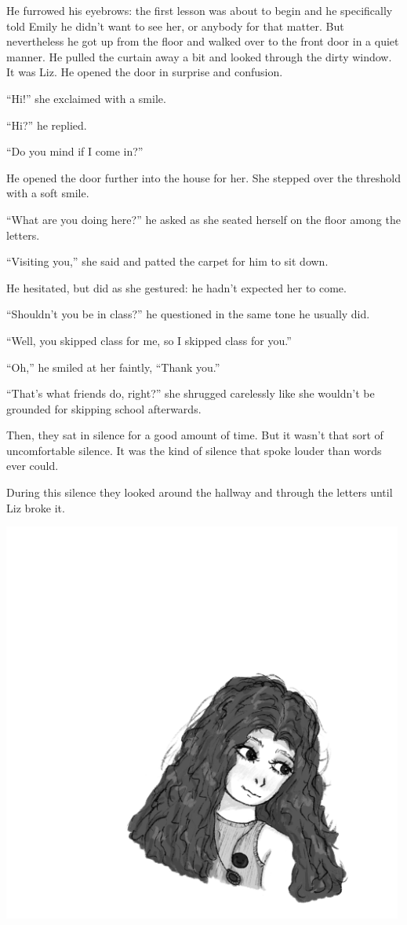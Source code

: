 He furrowed his eyebrows: the first lesson was about to begin and he specifically told Emily he didn't want to see her, or anybody for that matter. But nevertheless he got up from the floor and walked over to the front door in a quiet manner. He pulled the curtain away a bit and looked through the dirty window. It was Liz. He opened the door in surprise and confusion.

“Hi!” she exclaimed with a smile.

“Hi?” he replied.

“Do you mind if I come in?”

He opened the door further into the house for her. She stepped over the threshold with a soft smile.

“What are you doing here?” he asked as she seated herself on the floor among the letters.

“Visiting you,” she said and patted the carpet for him to sit down.

He hesitated, but did as she gestured: he hadn't expected her to come.

“Shouldn't you be in class?” he questioned in the same tone he usually did.

“Well, you skipped class for me, so I skipped class for you.”

“Oh,” he smiled at her faintly, “Thank you.”

“That's what friends do, right?” she shrugged carelessly like she wouldn't be grounded for skipping school afterwards.

Then, they sat in silence for a good amount of time. But it wasn't that sort of uncomfortable silence. It was the kind of silence that spoke louder than words ever could.

During this silence they looked around the hallway and through the letters until Liz broke it.

\includegraphics[width=0.99\textwidth]{Liz.png}


